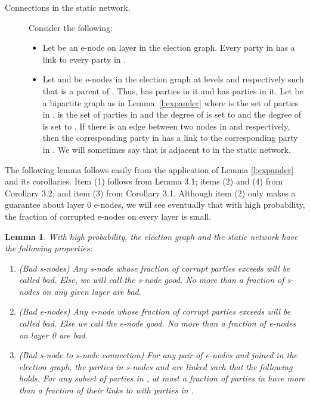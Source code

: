 \documentclass[11pt,letter]{article}
\theoremstyle{mytheoremstyle}
\newtheorem{lemma}{Lemma}
\begin{document}
\begin{description}
{\begin{description}
	\item[Connections in the static network.] Consider the following:
	\begin{itemize}	
		\item Let  be an \textsf{e-node} on layer  in the election graph.
		Every party in  has a link to every party in .
		
		\item Let  and  be \textsf{e-node}s in the election graph at levels  and  respectively such that  is a parent of . Thus,  has  parties in it and  has  parties in it. Let  be a bipartite graph as in Lemma~\ref{l:expander} where  is the set of parties in ,  is the set of parties in  and the degree of  is set to  and the degree of  is set to .  If there is an edge between two nodes in  and  respectively, then the corresponding party in  has a link to the corresponding party in . We will sometimes say that  is adjacent to  in the static network.
	\end{itemize}
\end{description}

The following lemma follows easily from the application of Lemma \ref{l:expander} and its corollaries.
Item (1) follows from Lemma 3.1; items (2) and (4)  from Corollary 3.2; and item (3) from Corollary 3.1. Although item (2) only makes a guarantee about layer 0 \textsf{e-node}s, we will see eventually that with high probability, the fraction of corrupted \textsf{e-node}s on every layer is small.

\begin{lemma}
	With high probability, the election graph and the static network have the following properties:
	
	\label{l:network properties}
	\begin{enumerate}
		\item (Bad \textsf{s-node}s) Any \textsf{s-node} whose fraction of corrupt parties exceeds  will be called {\it bad}. Else, we will call the \textsf{s-node} {\it good}. No more than a  fraction of \textsf{s-node}s on any given layer are bad.
		
		\item (Bad \textsf{e-node}s) Any \textsf{e-node} whose fraction of corrupt parties exceeds  will be called {\it bad}. Else we call the \textsf{e-node} {\it good}. No more than a  fraction of
		\textsf{e-node}s on layer 0 are bad.


		\item  (Bad \textsf{s-node} to \textsf{s-node} connection)
For any pair of \textsf{e-node}s  and  joined in the election graph, the parties in \textsf{s-node}s  and  are linked such that the following holds. For any subset  of parties in , at most a  fraction of parties in  have more than a  fraction of their links to  with parties in .
		

\end{enumerate}
\end{lemma}}
\end{description}
\end{document}
